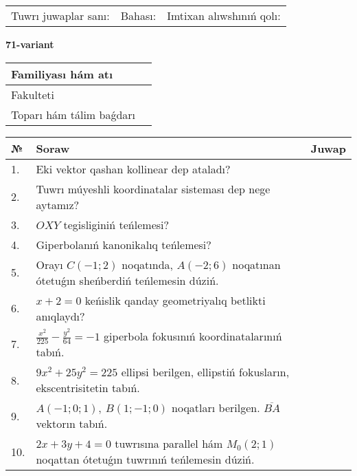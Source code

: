 \documentclass{article}
\begin{document}
\vspace{1cm}

\begin{tabular}{lll}
Tuwrı juwaplar sanı: \underline{\hspace{1.5cm}} & 
Bahası: \underline{\hspace{1.5cm}} & 
Imtixan alıwshınıń qolı: \underline{\hspace{2cm}} \\
\end{tabular}

\egroup

\newpage


\textbf{71-variant}\\

\bgroup
\def\arraystretch{1.6} %

\begin{tabular}{|m{5.7cm}|m{9.5cm}|}
\hline
Familiyası hám atı & \\
\hline
Fakulteti  & \\
\hline
Toparı hám tálim baǵdarı  & \\
\hline
\end{tabular}

\vspace{1cm}

\begin{tabular}{|m{0.7cm}|m{10cm}|m{4cm}|}
\hline
№ & Soraw & Juwap \\
\hline
1. & Eki vektor qashan kollinear dep ataladı? &  \\
\hline
2. & Tuwrı múyeshli koordinatalar sisteması dep nege aytamız? &  \\
\hline
3. & $OXY$ tegisliginiń teńlemesi? &  \\
\hline
4. & Giperbolanıń kanonikalıq teńlemesi? &  \\
\hline
5. & Orayı $C (-1;2)$ noqatında, $A (-2;6 )$ noqatınan ótetuǵın sheńberdiń teńlemesin dúziń. &  \\
\hline
6. & $x+2=0$ keńislik qanday geometriyalıq betlikti anıqlaydı? &  \\
\hline
7. & $\frac{x^{2}}{225}-\frac{y^{2}}{64}=-1$ giperbola fokusınıń koordinatalarınıń tabıń. &  \\
\hline
8. & $9x^{2}+25y^{2}=225$ ellipsi berilgen, ellipstiń fokusların, ekscentrisitetin tabıń. &  \\
\hline
9. & $A (-1;0;1),\ B (1;-1;0)$ noqatları berilgen. $\overline{BA}$ vektorın tabıń. &  \\
\hline
10. & $2x+3y+4=0$ tuwrısına parallel hám $M_{0} (2;1)$ noqattan ótetuǵın tuwrınıń teńlemesin dúziń. &  \\
\hline
\end{tabular}
\end{document}
